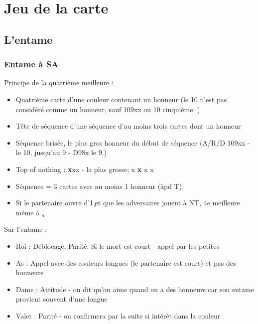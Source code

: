 \documentclass[a4paper]{article}
\begin{document}
\section{Jeu de la carte}

\subsection{L'entame}

\subsubsection{Entame à SA}

Principe de la quatrième meilleure :

\begin{itemize}
\item Quatrième carte d'une couleur contenant un honneur (le 10 n'est pas considéré comme un honneur, sauf 109xx ou 10 cinquième. )

\item Tête de séquence d'une séquence d'au moins trois cartes dont un honneur

\item Séquence brisée, le plus gros honneur du début de séquence (A/R/D 109xx - le 10, jusqu'au 9 - D98x le 9.)

\item Top of nothing : \textbf{x}xx - la plus grosse; x \textbf{x} x x

\item Séquence = 3 cartes avec au moins 1 honneur (àpd T).

\item Si le partenaire ouvre d'1\c\ et que les adversaires jouent à NT, 4e meilleure même à \c .

\end{itemize}

Sur l'entame :

\begin{itemize}
\item Roi : Déblocage, Parité. Si le mort est court - appel par les petites

\item As : Appel avec des couleurs longues (le partenaire est court) et pas des honneurs

\item Dame : Attitude - on dit qu’on aime quand on a des honneurs car son entame provient souvent d’une longue

\item Valet : Parité - on confirmera par la suite si intérêt dans la couleur

\end{itemize}
\end{document}
